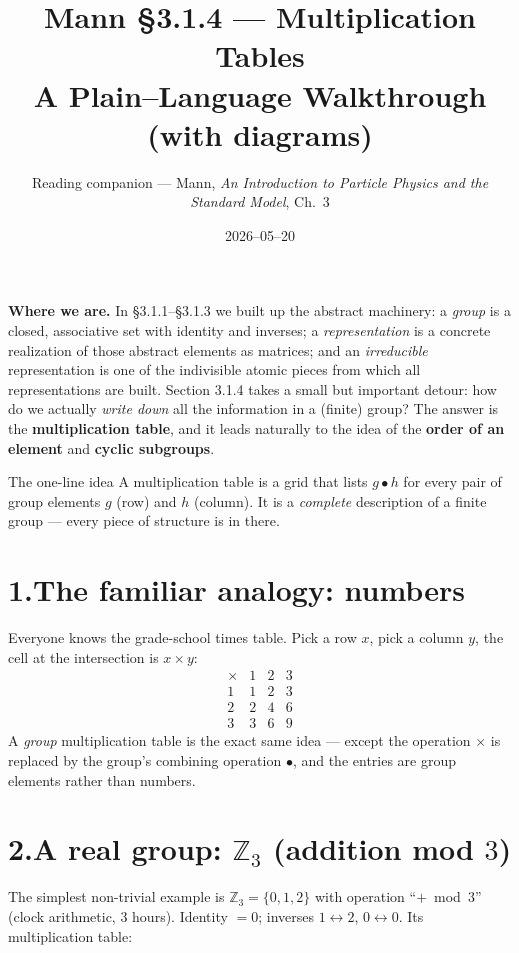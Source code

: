 \documentclass[11pt]{article}
\title{\textbf{Mann \S3.1.4 --- Multiplication Tables}\\[2pt]
\large A Plain--Language Walkthrough (with diagrams)}
\author{Reading companion --- Mann, \emph{An Introduction to Particle Physics
and the Standard Model}, Ch.~3}
\date{2026--05--20}
\begin{document}
\maketitle

\noindent\textbf{Where we are.} In \S3.1.1--\S3.1.3 we built up the abstract
machinery: a \emph{group} is a closed, associative set with identity and
inverses; a \emph{representation} is a concrete realization of those abstract
elements as matrices; and an \emph{irreducible} representation is one of the
indivisible atomic pieces from which all representations are built. Section
3.1.4 takes a small but important detour: how do we actually \emph{write down}
all the information in a (finite) group? The answer is the
\textbf{multiplication table}, and it leads naturally to the idea of the
\textbf{order of an element} and \textbf{cyclic subgroups}.

\begin{keybox}{The one-line idea}
A multiplication table is a grid that lists $g \bullet h$ for every pair of
group elements $g$ (row) and $h$ (column). It is a \emph{complete} description
of a finite group --- every piece of structure is in there.
\end{keybox}

\section*{1.\quad The familiar analogy: numbers}

Everyone knows the grade-school times table. Pick a row $x$, pick a column
$y$, the cell at the intersection is $x \times y$:
\[
\begin{array}{c|ccc}
\times & 1 & 2 & 3 \\ \hline
1 & 1 & 2 & 3 \\
2 & 2 & 4 & 6 \\
3 & 3 & 6 & 9
\end{array}
\]
A \emph{group} multiplication table is the exact same idea --- except the
operation $\times$ is replaced by the group's combining operation $\bullet$,
and the entries are group elements rather than numbers.

\section*{2.\quad A real group: $\mathbb{Z}_3$ (addition mod $3$)}

The simplest non-trivial example is $\mathbb{Z}_3 = \{0,1,2\}$ with operation
``$+$~mod~$3$'' (clock arithmetic, 3 hours). Identity $= 0$; inverses
$1 \leftrightarrow 2$, $0 \leftrightarrow 0$. Its multiplication table:
\end{document}
